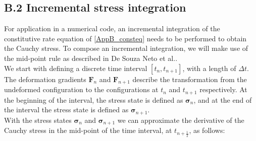 \subsection*{B.2 Incremental stress integration}
%
For application in a numerical code, an incremental integration of the constitutive rate equation of \ref{AppB_consteq} needs to be performed to obtain the Cauchy stress. To compose an incremental integration, we will make use of the mid-point rule as described in De Souza Neto et al.\cite{compmethodsplasticity}{\color{red}{check this reference}}.\\ 
\newline
We start with defining a discrete time interval $[t_n, t_{n+1}]$, with a length of $\Delta t$. The deformation gradients $\boldsymbol{F}_n$ and $\boldsymbol{F}_{n+1}$ describe the transformation from the undeformed configuration to the configurations at $t_n$ and $t_{n+1}$ respectively. At the beginning of the interval, the stress state is defined as $\boldsymbol{\sigma}_n$, and at the end of the interval the stress state is defined as $\boldsymbol{\sigma}_{n+1}$.\\
\newline
With the stress states $\boldsymbol{\sigma}_n$ and $\boldsymbol{\sigma}_{n+1}$ we can approximate the derivative of the Cauchy stress in the mid-point of the time interval, at $t_{n+\frac{1}{2}}$, as follows:
